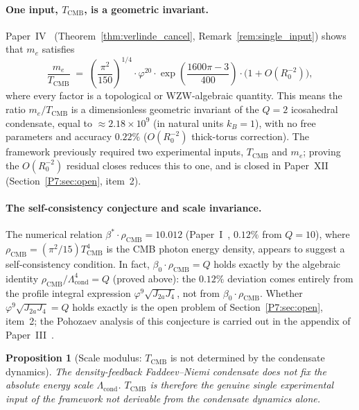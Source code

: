\documentclass[11pt,a4paper]{article}
\newtheorem{proposition}[theorem]{Proposition}
\theoremstyle{definition}
\theoremstyle{remark}
\newcommand{\vp}{\varphi}
\newcommand{\bst}{\beta^{*}}
\newcommand{\bz}{\beta_{0}}
\newcommand{\TCMB}{T_{\mathrm{CMB}}}
\newcommand{\rCMB}{\rho_{\mathrm{CMB}}}
\newcommand{\Lcond}{\Lambda_{\mathrm{cond}}}
\newcommand{\Ja}{J_{2a}}
\newcommand{\Jfour}{J_{4}}
\begin{document}
\paragraph{One input, $\TCMB$, is a geometric invariant.}
Paper~IV~\cite{Paper4} (Theorem~\ref{thm:verlinde_cancel},
Remark~\ref{rem:single_input}) shows that $m_e$ satisfies
\begin{equation}
  \frac{m_e}{\TCMB}
  \;=\; \left(\frac{\pi^2}{150}\right)^{\!1/4}
        \cdot\vp^{20}\cdot
        \exp\!\left(\frac{1600\pi-3}{400}\right)
        \cdot\bigl(1 + O(R_0^{-2})\bigr),
  \label{P7:eq:me_TCMB_ratio_corrected}
\end{equation}
where every factor is a topological or WZW-algebraic quantity.
This means the ratio $m_e/\TCMB$ is a dimensionless geometric invariant
of the $Q=2$ icosahedral condensate, equal to $\approx 2.18\times10^9$
(in natural units $k_B=1$), with no free parameters and accuracy $0.22\%$
($O(R_0^{-2})$ thick-torus correction).
The framework previously required two experimental inputs,
$\TCMB$ and $m_e$; proving the $O(R_0^{-2})$ residual closes reduces 
this to one, and is closed in Paper~XII~\cite{Paper12}
(Section~\ref{P7:sec:open}, item~2).

\paragraph{The self-consistency conjecture and scale invariance.}
The numerical relation $\bst\cdot\rCMB = 10.012$
(Paper~I~\cite{Paper1}, $0.12\%$ from $Q=10$), where
$\rCMB = (\pi^2/15)\TCMB^4$ is the CMB photon energy density,
appears to suggest a self-consistency condition.
In fact, $\bz\cdot\rCMB = Q$ holds exactly by the algebraic identity
$\rCMB/\Lcond^4 = Q$ (proved above): the $0.12\%$ deviation comes
entirely from the profile integral expression $\vp^9\sqrt{\Ja\Jfour}$,
not from $\bz\cdot\rCMB$.
Whether $\vp^9\sqrt{\Ja\Jfour} = Q$ holds exactly is the open problem
of Section~\ref{P7:sec:open}, item~2; the Pohozaev analysis of this conjecture
is carried out in the appendix of Paper~III~\cite{Paper3}.

\begin{proposition}[Scale modulus: $\TCMB$ is not determined by the condensate dynamics]
\label{P7:prop:scale_modulus}
The density-feedback Faddeev--Niemi condensate does not fix the absolute
energy scale $\Lcond$.  $\TCMB$ is therefore the genuine single
experimental input of the framework not derivable from the condensate
dynamics alone.
\end{proposition}
\end{document}
